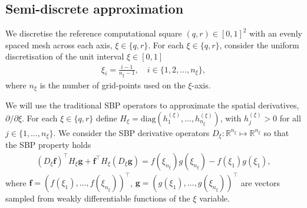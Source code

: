 \documentclass{article}
\numberwithin{equation}{section}
\def\R{\mathbb{R}}
\theoremstyle{definition}
\begin{document}
\subsection{Semi-discrete approximation}
We discretise the reference computational square $(q,r)\in   [0,1]^2$ with an evenly spaced mesh across each axis, $\xi \in \{ q, r \}$. 
% 
    For each $\xi \in \{q,r\}$, consider the uniform discretisation of the unit interval $\xi \in [0, 1]$ 
    \begin{align}
        \xi_{i} = \frac{i-1}{n_{\xi}-1}, \quad i \in \{1, 2, \dots, n_{\xi} \}, 
    \end{align}
    where $n_{\xi}$ is the number of grid-points used on the $\xi$-axis. 
    
    We will use the traditional SBP operators \cite{BStrand1994,kreiss1974finite} to approximate the spatial derivatives, $\partial/{\partial\xi}$. 
	For each $\xi \in \{q,r\}$ define $H_{\xi} =\text{diag}\left(h_1^{(\xi)} , \dots, h_{n_{\xi}}^{(\xi)}\right)$, with $h_j^{(\xi)} >0$ for all $j \in \{1, \dots, n_\xi \}$.
	We consider the SBP derivative operators $D_{\xi} : \R^{n_{\xi}} \mapsto \R^{n_{\xi}}$ so that the SBP property holds
	\begin{align}\label{eq:upw_SBP}
        (D_{\xi} \bm{f} )^\top H_{\xi} \bm{g} +  \bm{f}^\top H_{\xi} (D_{\xi }\bm{g}) = f(\xi_{n_{\xi}})g(\xi_{n_{\xi}}) - f(\xi_1)g(\xi_1),
    \end{align}
    where  $\bm{f} = (f(\xi_1), \dots , f(\xi_{n_{\xi}}) )^\top$, $\bm{g} = (g(\xi_1), \dots , g(\xi_{n_{\xi}}) )^\top$ are vectors sampled from weakly differentiable functions of the $\xi$ variable. 
% 
\end{document}
